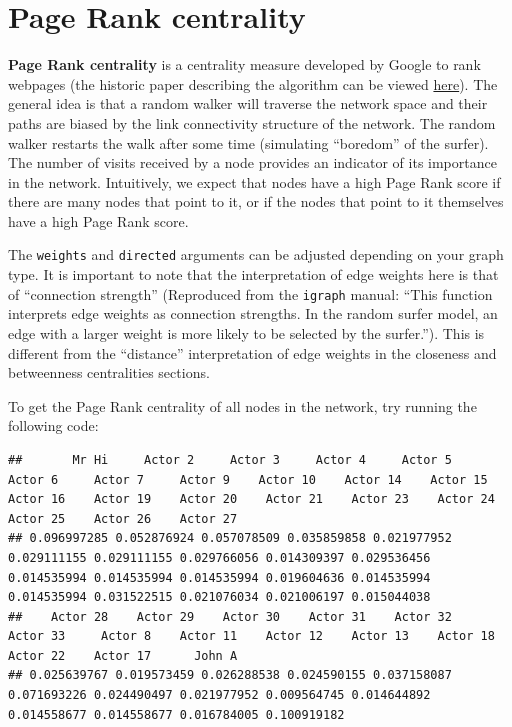 \documentclass[
]{book}
\newenvironment{Shaded}{\begin{snugshade}}{\end{snugshade}}
\newcommand{\AttributeTok}[1]{\textcolor[rgb]{0.13,0.29,0.53}{#1}}
\newcommand{\CommentTok}[1]{\textcolor[rgb]{0.56,0.35,0.01}{\textit{#1}}}
\newcommand{\ConstantTok}[1]{\textcolor[rgb]{0.56,0.35,0.01}{#1}}
\newcommand{\FunctionTok}[1]{\textcolor[rgb]{0.13,0.29,0.53}{\textbf{#1}}}
\newcommand{\NormalTok}[1]{#1}
\newcommand{\SpecialCharTok}[1]{\textcolor[rgb]{0.81,0.36,0.00}{\textbf{#1}}}
\begin{document}
\section{Page Rank centrality}\label{page-rank-centrality}

\textbf{Page Rank centrality} is a centrality measure developed by Google to rank webpages (the historic paper describing the algorithm can be viewed \href{http://infolab.stanford.edu/~backrub/google.html}{here}). The general idea is that a random walker will traverse the network space and their paths are biased by the link connectivity structure of the network. The random walker restarts the walk after some time (simulating ``boredom'' of the surfer). The number of visits received by a node provides an indicator of its importance in the network. Intuitively, we expect that nodes have a high Page Rank score if there are many nodes that point to it, or if the nodes that point to it themselves have a high Page Rank score.

The \texttt{weights} and \texttt{directed} arguments can be adjusted depending on your graph type. It is important to note that the interpretation of edge weights here is that of ``connection strength'' (Reproduced from the \texttt{igraph} manual: ``This function interprets edge weights as connection strengths. In the random surfer model, an edge with a larger weight is more likely to be selected by the surfer.''). This is different from the ``distance'' interpretation of edge weights in the closeness and betweenness centralities sections.

To get the Page Rank centrality of all nodes in the network, try running the following code:

\begin{Shaded}
\end{Shaded}

\begin{verbatim}
##       Mr Hi     Actor 2     Actor 3     Actor 4     Actor 5     Actor 6     Actor 7     Actor 9    Actor 10    Actor 14    Actor 15    Actor 16    Actor 19    Actor 20    Actor 21    Actor 23    Actor 24    Actor 25    Actor 26    Actor 27 
## 0.096997285 0.052876924 0.057078509 0.035859858 0.021977952 0.029111155 0.029111155 0.029766056 0.014309397 0.029536456 0.014535994 0.014535994 0.014535994 0.019604636 0.014535994 0.014535994 0.031522515 0.021076034 0.021006197 0.015044038 
##    Actor 28    Actor 29    Actor 30    Actor 31    Actor 32    Actor 33     Actor 8    Actor 11    Actor 12    Actor 13    Actor 18    Actor 22    Actor 17      John A 
## 0.025639767 0.019573459 0.026288538 0.024590155 0.037158087 0.071693226 0.024490497 0.021977952 0.009564745 0.014644892 0.014558677 0.014558677 0.016784005 0.100919182
\end{verbatim}
\end{document}
